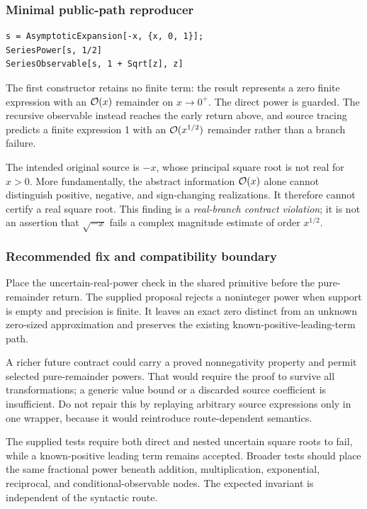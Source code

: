\subsubsection*{Minimal public-path reproducer}

\begin{lstlisting}
s = AsymptoticExpansion[-x, {x, 0, 1}];
SeriesPower[s, 1/2]
SeriesObservable[s, 1 + Sqrt[z], z]
\end{lstlisting}
The first constructor retains no finite term: the result represents a zero finite expression with an $\mathcal O(x)$ remainder on $x\to0^+$. The direct power is guarded. The recursive observable instead reaches the early return above, and source tracing predicts a finite expression 1 with an $\mathcal O(x^{1/2})$ remainder rather than a branch failure.

The intended original source is $-x$, whose principal square root is not real for $x>0$. More fundamentally, the abstract information $\mathcal O(x)$ alone cannot distinguish positive, negative, and sign-changing realizations. It therefore cannot certify a real square root. This finding is a \emph{real-branch contract violation}; it is not an assertion that $\sqrt{-x}$ fails a complex magnitude estimate of order $x^{1/2}$.

\subsubsection*{Recommended fix and compatibility boundary}

Place the uncertain-real-power check in the shared primitive before the pure-remainder return. The supplied proposal rejects a noninteger power when support is empty and precision is finite. It leaves an exact zero distinct from an unknown zero-sized approximation and preserves the existing known-positive-leading-term path.

A richer future contract could carry a proved nonnegativity property and permit selected pure-remainder powers. That would require the proof to survive all transformations; a generic value bound or a discarded source coefficient is insufficient. Do not repair this by replaying arbitrary source expressions only in one wrapper, because it would reintroduce route-dependent semantics.

The supplied tests require both direct and nested uncertain square roots to fail, while a known-positive leading term remains accepted. Broader tests should place the same fractional power beneath addition, multiplication, exponential, reciprocal, and conditional-observable nodes. The expected invariant is independent of the syntactic route.

